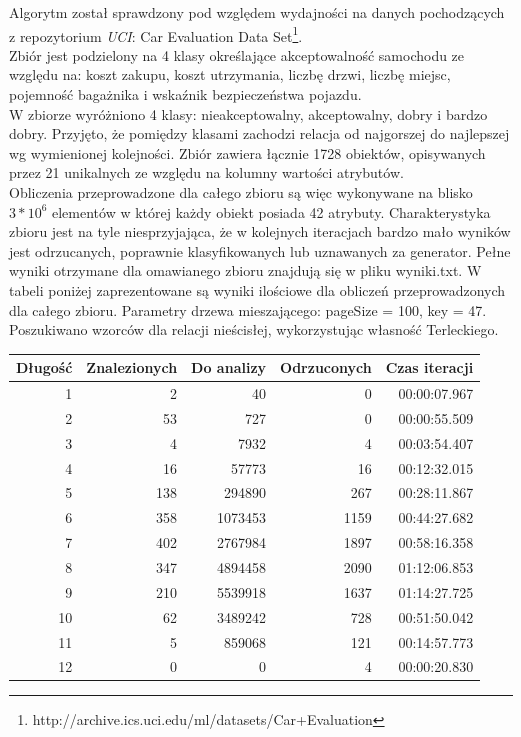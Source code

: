 \documentclass[a4paper,12pt]{article}
\begin{document}
Algorytm został sprawdzony pod względem wydajności na danych pochodzących z repozytorium \textit{UCI}: Car Evaluation Data Set\footnote{http://archive.ics.uci.edu/ml/datasets/Car+Evaluation}.\\

Zbiór jest podzielony na 4 klasy określające akceptowalność samochodu ze względu na: koszt zakupu, koszt utrzymania, liczbę drzwi, liczbę miejsc, pojemność bagażnika i wskaźnik bezpieczeństwa pojazdu.\\

W zbiorze wyróżniono 4 klasy: nieakceptowalny, akceptowalny, dobry i bardzo dobry. Przyjęto, że pomiędzy klasami zachodzi relacja od najgorszej do najlepszej wg wymienionej kolejności. Zbiór zawiera łącznie 1728 obiektów, opisywanych przez 21 unikalnych ze względu na kolumny wartości atrybutów.\\

Obliczenia przeprowadzone dla całego zbioru są więc wykonywane na blisko $3*10^6$ elementów w której każdy obiekt posiada 42 atrybuty. Charakterystyka zbioru jest na tyle niesprzyjająca, że w kolejnych iteracjach bardzo mało wyników jest odrzucanych, poprawnie klasyfikowanych lub uznawanych za generator. Pełne wyniki otrzymane dla omawianego zbioru znajdują się w pliku wyniki.txt. W tabeli poniżej zaprezentowane są wyniki ilościowe dla obliczeń przeprowadzonych dla całego zbioru. Parametry drzewa mieszającego: pageSize = 100, key = 47. Poszukiwano wzorców dla relacji nieścisłej, wykorzystując własność Terleckiego.

\vspace{0.5cm}

\begin{tabular}{|r|r|r|r|r|}
\hline
Długość & Znalezionych & Do analizy & Odrzuconych & Czas iteracji \\ \hline
1  & 2 & 40 & 0 & 00:00:07.967 \\ \hline 
2  & 53 & 727 & 0 & 00:00:55.509 \\ \hline
3  & 4 & 7932 & 4 & 00:03:54.407 \\ \hline
4  & 16 & 57773 & 16 & 00:12:32.015 \\ \hline
5  & 138 & 294890 & 267 & 00:28:11.867 \\ \hline
6  & 358 & 1073453 & 1159 & 00:44:27.682 \\ \hline
7  & 402 & 2767984 & 1897 & 00:58:16.358 \\ \hline
8  & 347 & 4894458 & 2090 & 01:12:06.853 \\ \hline
9  & 210 & 5539918 & 1637 & 01:14:27.725 \\ \hline
10 & 62 & 3489242 & 728 & 00:51:50.042 \\ \hline
11 & 5 & 859068 & 121 & 00:14:57.773 \\ \hline
12 & 0 & 0 & 4 & 00:00:20.830 \\ \hline

\end{tabular}
\end{document}
